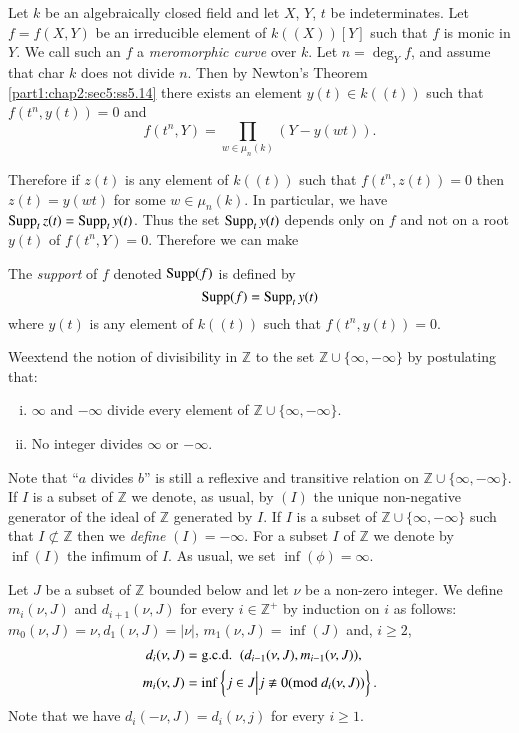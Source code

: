 Let $k$ be an algebraically closed field and let $X$, $Y$, $t$ be indeterminates. Let $f= f(X, Y)$ be an irreducible element of $k((X))[Y]$ such that $f$ is monic in $Y$. We call such an $f$ a {\em meromorphic curve} over $k$. Let $n= \deg_Y f$, and assume that char $k$ does not divide $n$. Then by Newton's Theorem \ref{part1:chap2:sec5:ss5.14} there exists an element $y(t) \in k ((t))$ such that $f (t^n, y(t))=0$ and 
$$
f(t^n, Y) = \prod_{w \in \mu_n (k)} (Y- y (wt)).
$$ 

Therefore if $z(t)$ is any element of $k((t))$ such that $f(t^n, z(t))=0$ then $z(t) = y(wt)$ for some $w \in \mu_n (k)$. In particular, we have $\operatorname{Supp}_t z(t) = \operatorname{Supp}_t y(t)$. Thus the set $\operatorname{Supp}_t y(t)$ depends only on $f$ and not on a root $y(t)$ of $f(t^n, Y)=0$. Therefore we can make

\setcounter{thm}{1}
\begin{defi}\label{part1:chap2:sec6:def6.2} 
  The {\em support} of $f$ denoted $\operatorname{Supp} (f)$ is defined by
  $$
  \operatorname{Supp} (f) = \operatorname{Supp}_t y(t)
  $$
  where $y(t)$ is any element of $k((t))$ such that $f(t^n, y(t))=0$.
\end{defi}

\begin{convn}\label{part1:chap2:sec6:convn6.3} 
  We\pageoriginale extend the notion of divisibility in $\mathbb{Z}$ to the set $\mathbb{Z} \cup \{ \infty, - \infty\}$ by postulating that:
\begin{enumerate}[(i)]
\item $\infty$ and $- \infty$ divide every element of $\mathbb{Z} \cup \{ \infty, - \infty\}$.
  \item No integer divides $\infty$ or $-\infty$.
\end{enumerate}
Note that ``$a$ divides $b$'' is still a reflexive and transitive relation on $\mathbb{Z}\cup \{ \infty, - \infty\}$. If $I$ is a subset of $\mathbb{Z}$ we denote, as usual, by \gcd $(I)$ the unique non-negative generator of the ideal of $\mathbb{Z}$ generated by $I$. If $I$ is a subset of $\mathbb{Z} \cup \{ \infty, - \infty\}$ such that $I \not\subset \mathbb{Z}$ then we {\em define} \gcd $(I)=- \infty$. For a subset $I$ of $\mathbb{Z}$ we denote by $\inf (I)$ the infimum of $I$. As usual, we set $\inf (\phi)= \infty$.
\end{convn}

\begin{defi}\label{part1:chap2:sec6:def6.4} 
  Let $J$ be a subset of $\mathbb{Z}$ bounded below and let $\nu$ be a non-zero integer. We define $m_i (\nu, J)$ and $d_{i+1} (\nu, J)$ for every $i \in \mathbb{Z}^+$ by induction on $i$ as follows: $m_0 (\nu, J)= \nu, d_1 (\nu, J)= |\nu|$, $m_1(\nu, J)= \inf (J)$ and, $i \geq 2$, 
\begin{align*}
d_i (\nu, J) & = \text{\gcd}~ (d_{i-1} (\nu, J), m_{i-1} (\nu, J)),\\
m_i (\nu, J) & =  \inf \left\{ j \in J \Big| j \nequiv 0 (\text{mod } d_i (\nu, J))\right\}.
\end{align*}
Note that we have $d_i (- \nu, J) = d_i (\nu, j)$ for every $i \geq 1$.
\end{defi}

